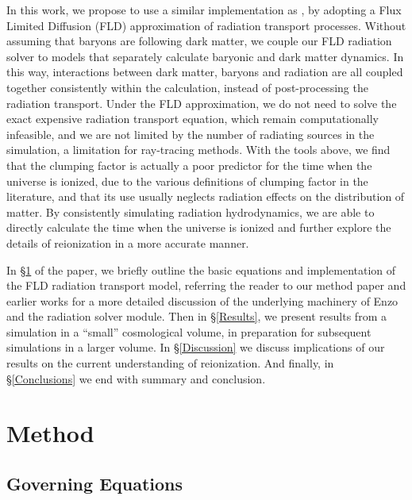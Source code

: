 \documentclass[letterpaper,10pt]{article}
\renewcommand{\(}{\left(}
\renewcommand{\)}{\right)}
\begin{document}
In this work, we propose to use a similar implementation as 
\citealt{PetkovaSpringel2011b}, by adopting a Flux Limited Diffusion
(FLD) approximation of radiation transport processes.  Without 
assuming that baryons are following dark matter, we couple our FLD
radiation solver to models that separately calculate baryonic and dark
matter dynamics.  In this way, interactions between dark matter,
baryons and radiation are all coupled together consistently
within the calculation, instead of post-processing the radiation transport.
Under the FLD approximation, we do not need to solve the exact
expensive radiation transport equation, which remain computationally
infeasible, and we are not limited by the number of radiating sources
in the simulation, a limitation for ray-tracing methods.  With the
tools above, we find that the clumping factor is actually a poor
predictor for the time when the universe is ionized, due to the various
definitions of clumping factor in the literature, and that its use
usually neglects radiation effects on the distribution of matter.  By
consistently simulating radiation hydrodynamics, we are able to
directly calculate the time when the universe is ionized and further
explore the details of reionization in a more accurate manner. 

In \S\ref{Method} of the paper, we briefly outline the basic equations
and implementation of the FLD radiation transport model, referring the
reader to our method paper and earlier works for a more detailed
discussion of the underlying machinery of Enzo and the radiation
solver module.  Then in \S\ref{Results}, we present results from a
simulation in a ``small'' cosmological volume, in preparation for
subsequent simulations in a larger volume.  In \S\ref{Discussion} we
discuss implications of our results on the current understanding of
reionization.  And finally, in \S\ref{Conclusions} we end with
summary and conclusion.


\section{Method}
\label{Method}

\subsection{Governing Equations}
\end{document}
